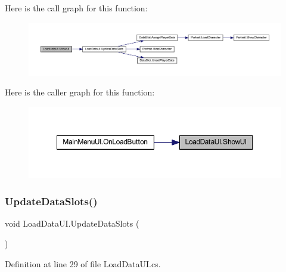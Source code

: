 Here is the call graph for this function\+:
\nopagebreak
\begin{figure}[H]
\begin{center}
\leavevmode
\includegraphics[width=350pt]{class_load_data_u_i_ac0ab99a18f93b2092d30e1ecea86154d_cgraph}
\end{center}
\end{figure}
Here is the caller graph for this function\+:
\nopagebreak
\begin{figure}[H]
\begin{center}
\leavevmode
\includegraphics[width=350pt]{class_load_data_u_i_ac0ab99a18f93b2092d30e1ecea86154d_icgraph}
\end{center}
\end{figure}
\mbox{\label{class_load_data_u_i_a2a36a17c6455a8ca8ee3b92dbbce0503}} 
\subsubsection{\texorpdfstring{UpdateDataSlots()}{UpdateDataSlots()}}
{\footnotesize\ttfamily void Load\+Data\+U\+I.\+Update\+Data\+Slots (\begin{DoxyParamCaption}{ }\end{DoxyParamCaption})}



Definition at line 29 of file Load\+Data\+U\+I.\+cs.

